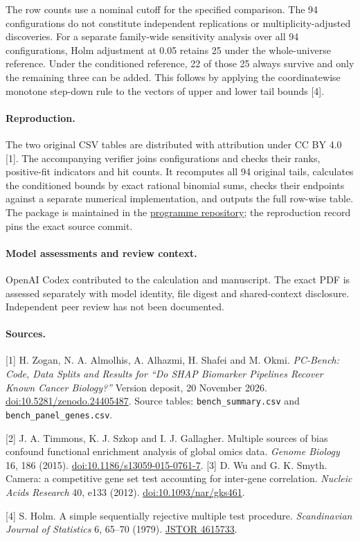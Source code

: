 \documentclass[11pt]{article}
\begin{document}
The row counts use a nominal cutoff for the specified comparison. The 94 configurations do not constitute independent replications or multiplicity-adjusted discoveries. For a separate family-wide sensitivity analysis over all 94 configurations, Holm adjustment at 0.05 retains 25 under the whole-universe reference. Under the conditioned reference, 22 of those 25 always survive and only the remaining three can be added. This follows by applying the coordinatewise monotone step-down rule to the vectors of upper and lower tail bounds [4].

\paragraph{Reproduction.} The two original CSV tables are distributed with attribution under CC BY 4.0 [1]. The accompanying verifier joins configurations and checks their ranks, positive-fit indicators and hit counts. It recomputes all 94 original tails, calculates the conditioned bounds by exact rational binomial sums, checks their endpoints against a separate numerical implementation, and outputs the full row-wise table. The package is maintained in the \href{https://github.com/lluiseriksson/THE-ERIKSSON-PROGRAMME/tree/research/pcbench-positive-support/audits/pcbench-positive-support}{programme repository}; the reproduction record pins the exact source commit.

\paragraph{Model assessments and review context.} OpenAI Codex contributed to the calculation and manuscript. The exact PDF is assessed separately with model identity, file digest and shared-context disclosure. Independent peer review has not been documented.

\paragraph{Sources.}
[1] H. Zogan, N. A. Almolhis, A. Alhazmi, H. Shafei and M. Okmi. \emph{PC-Bench: Code, Data Splits and Results for ``Do SHAP Biomarker Pipelines Recover Known Cancer Biology?''} Version deposit, 20 November 2026. \href{https://doi.org/10.5281/zenodo.24405487}{doi:10.5281/zenodo.24405487}. Source tables: \texttt{bench\_summary.csv} and \texttt{bench\_panel\_genes.csv}.

[2] J. A. Timmons, K. J. Szkop and I. J. Gallagher. Multiple sources of bias confound functional enrichment analysis of global omics data. \emph{Genome Biology} 16, 186 (2015). \href{https://doi.org/10.1186/s13059-015-0761-7}{doi:10.1186/s13059-015-0761-7}.
[3] D. Wu and G. K. Smyth. Camera: a competitive gene set test accounting for inter-gene correlation. \emph{Nucleic Acids Research} 40, e133 (2012). \href{https://doi.org/10.1093/nar/gks461}{doi:10.1093/nar/gks461}.

[4] S. Holm. A simple sequentially rejective multiple test procedure. \emph{Scandinavian Journal of Statistics} 6, 65--70 (1979). \href{https://www.jstor.org/stable/4615733}{JSTOR 4615733}.
\end{document}
